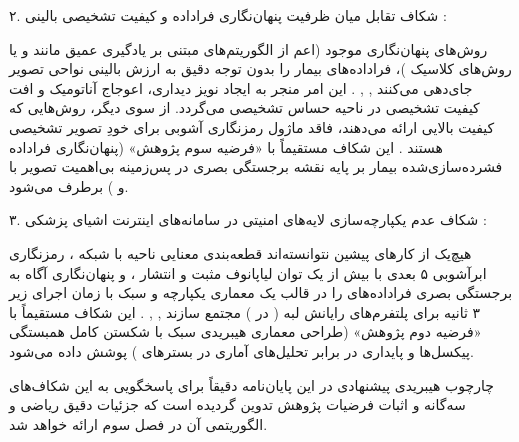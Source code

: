 ۲. شکاف تقابل میان ظرفیت پنهان‌نگاری فراداده و کیفیت تشخیصی بالینی :\par

روش‌های پنهان‌نگاری موجود (اعم از الگوریتم‌های مبتنی بر یادگیری عمیق مانند  و  یا روش‌های کلاسیک )، فراداده‌های بیمار را بدون توجه دقیق به ارزش بالینی نواحی تصویر جای‌دهی می‌کنند , , . این امر منجر به ایجاد نویز دیداری، اعوجاج آناتومیک و افت کیفیت تشخیصی  در ناحیه حساس تشخیصی  می‌گردد. از سوی دیگر، روش‌هایی که کیفیت بالایی ارائه می‌دهند، فاقد ماژول رمزنگاری آشوبی برای خودِ تصویر تشخیصی هستند . این شکاف مستقیماً با «فرضیه سوم پژوهش» (پنهان‌نگاری فراداده فشرده‌سازی‌شده بیمار بر پایه نقشه برجستگی بصری  در پس‌زمینه بی‌اهمیت تصویر با  و   ) برطرف می‌شود.\par



۳. شکاف عدم یکپارچه‌سازی لایه‌های امنیتی در سامانه‌های اینترنت اشیای پزشکی :\par

هیچ‌یک از کارهای پیشین نتوانسته‌اند قطعه‌بندی معنایی ناحیه  با شبکه ، رمزنگاری ابرآشوبی ۵ بعدی با بیش از یک توان لیاپانوف مثبت و انتشار ، و پنهان‌نگاری آگاه به برجستگی بصری  فراداده‌های  را در قالب یک معماری یکپارچه و سبک با زمان اجرای زیر ۳ ثانیه برای پلتفرم‌های رایانش لبه ( در ) مجتمع سازند , , . این شکاف مستقیماً با «فرضیه دوم پژوهش» (طراحی معماری هیبریدی سبک با شکستن کامل همبستگی پیکسل‌ها و پایداری در برابر تحلیل‌های آماری در بسترهای ) پوشش داده می‌شود.\par



چارچوب هیبریدی پیشنهادی در این پایان‌نامه دقیقاً برای پاسخگویی به این شکاف‌های سه‌گانه و اثبات فرضیات پژوهش تدوین گردیده است که جزئیات دقیق ریاضی و الگوریتمی آن در فصل سوم ارائه خواهد شد.\par


